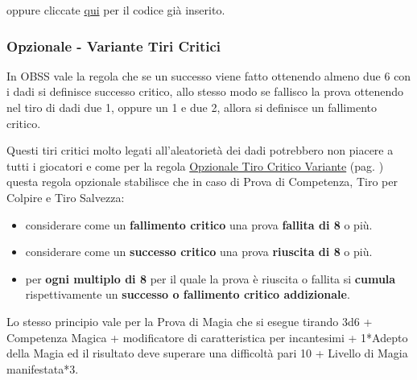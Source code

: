 \begin{multicols}{2}
\medskip


\medskip

oppure cliccate \href{https://anydice.com/program/2610e}{qui} per il codice già inserito.

\subsubsection{Opzionale - Variante Tiri Critici}\label{variantetiricritici}\hypertarget{variantetiricritici}{}

In OBSS vale la regola che se un successo viene fatto ottenendo almeno due 6 con i dadi si definisce successo critico, allo stesso modo se fallisco la prova ottenendo nel tiro di dadi due 1, oppure un 1 e due 2, allora si definisce un fallimento critico.

Questi tiri critici molto legati all'aleatorietà dei dadi potrebbero non piacere a tutti i giocatori e come per la regola \hyperlink{tirocriticovariante}{Opzionale Tiro Critico Variante} (pag. \pageref{tirocriticovariante}) questa regola opzionale stabilisce che in caso di Prova di Competenza, Tiro per Colpire e Tiro Salvezza:

\begin{itemize}[leftmargin=*] \setlength{\itemsep}{0pt}
\item considerare come un \textbf{fallimento critico} una prova \textbf{fallita di 8} o più.
\item considerare come un \textbf{successo critico} una prova \textbf{riuscita di 8} o più.
\item per \textbf{ogni multiplo di 8} per il quale la prova è riuscita o fallita si \textbf{cumula} rispettivamente un \textbf{successo o fallimento critico addizionale}.
\end{itemize}

Lo stesso principio vale per la Prova di Magia che si esegue tirando 3d6 + Competenza Magica + modificatore di caratteristica per incantesimi + 1*Adepto della Magia ed il risultato deve superare una difficoltà pari 10 + Livello di Magia manifestata*3. 


\end{multicols}
